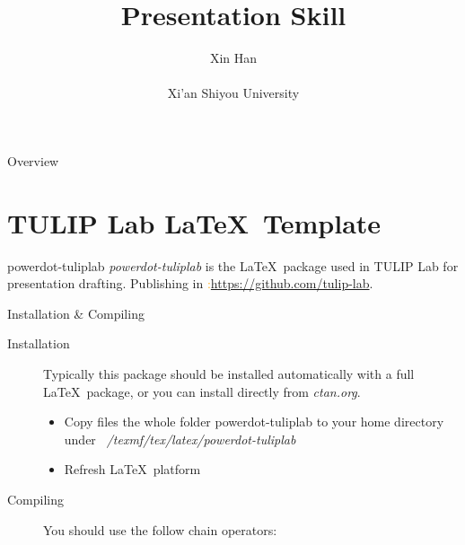 \documentclass[
 size=14pt,
 paper=smartboard,  %
 mode=present, 		%
 display=slides, 	%
 style=tuliplab,  	%
 pauseslide,
 fleqn,leqno]{powerdot}
\title{Presentation Skill}
\author{Xin Han
\\
\\Xi'an Shiyou University
}
\date{\gitCommitterDate}
\begin{document}
\maketitle



\begin{slide}[toc=,bm=]{Overview}
\tableofcontents[content=currentsection,type=1]
\end{slide}


\section{TULIP Lab \LaTeX\ Template}

\begin{slide}{powerdot-tuliplab}
\textit{powerdot-tuliplab} is the \LaTeX\ package used in TULIP Lab for presentation drafting.
Publishing in \textcolor{orange}{\faGithub:}\url{https://github.com/tulip-lab}.
\begin{center}
\end{center}
\end{slide}

\begin{slide}[toc=,bm=]{Installation \& Compiling}
\begin{description}
  \item[Installation] Typically this package should be installed automatically with a full \LaTeX\ package,
      or you can install directly from \textit{ctan.org}.
      \begin{itemize}
        \item Copy files the whole folder powerdot-tuliplab to your home directory under \textit{~/texmf/tex/latex/powerdot-tuliplab}
        \item Refresh \LaTeX\ platform
      \end{itemize}
  \item[Compiling]You should use the follow chain operators:\\ \begin{center}
\end{center}
\end{description}
\end{slide}
\end{document}
